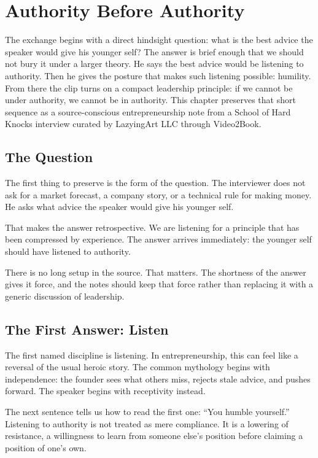 \chapter{Authority Before Authority}

The exchange begins with a direct hindsight question: what is the best advice the speaker would give his younger self? The answer is brief enough that we should not bury it under a larger theory. He says the best advice would be listening to authority. Then he gives the posture that makes such listening possible: humility. From there the clip turns on a compact leadership principle: if we cannot be under authority, we cannot be in authority. This chapter preserves that short sequence as a source-conscious entrepreneurship note from a School of Hard Knocks interview curated by LazyingArt LLC through Video2Book.

\section{The Question}

The first thing to preserve is the form of the question. The interviewer does not ask for a market forecast, a company story, or a technical rule for making money. He asks what advice the speaker would give his younger self.

That makes the answer retrospective. We are listening for a principle that has been compressed by experience. The answer arrives immediately: the younger self should have listened to authority.

There is no long setup in the source. That matters. The shortness of the answer gives it force, and the notes should keep that force rather than replacing it with a generic discussion of leadership.

\section{The First Answer: Listen}

The first named discipline is listening. In entrepreneurship, this can feel like a reversal of the usual heroic story. The common mythology begins with independence: the founder sees what others miss, rejects stale advice, and pushes forward. The speaker begins with receptivity instead.

The next sentence tells us how to read the first one: ``You humble yourself.'' Listening to authority is not treated as mere compliance. It is a lowering of resistance, a willingness to learn from someone else's position before claiming a position of one's own.

